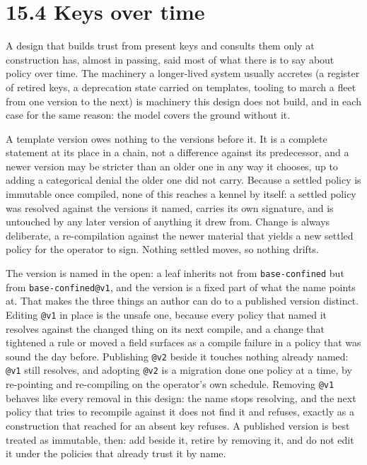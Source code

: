 \hypertarget{keys-over-time}{%
\section{15.4 Keys over time}\label{keys-over-time}}

A design that builds trust from present keys and consults them only at
construction has, almost in passing, said most of what there is to say
about policy over time. The machinery a longer-lived system usually
accretes (a register of retired keys, a deprecation state carried on
templates, tooling to march a fleet from one version to the next) is
machinery this design does not build, and in each case for the same
reason: the model covers the ground without it.

A template version owes nothing to the versions before it. It is a
complete statement at its place in a chain, not a difference against its
predecessor, and a newer version may be stricter than an older one in
any way it chooses, up to adding a categorical denial the older one did
not carry. Because a settled policy is immutable once compiled, none of
this reaches a kennel by itself: a settled policy was resolved against
the versions it named, carries its own signature, and is untouched by
any later version of anything it drew from. Change is always deliberate,
a re-compilation against the newer material that yields a new settled
policy for the operator to sign. Nothing settled moves, so nothing
drifts.

The version is named in the open: a leaf inherits not from
\texttt{base-confined} but from \texttt{base-confined@v1}, and the
version is a fixed part of what the name points at. That makes the three
things an author can do to a published version distinct. Editing
\texttt{@v1} in place is the unsafe one, because every policy that named
it resolves against the changed thing on its next compile, and a change
that tightened a rule or moved a field surfaces as a compile failure in
a policy that was sound the day before. Publishing \texttt{@v2} beside
it touches nothing already named: \texttt{@v1} still resolves, and
adopting \texttt{@v2} is a migration done one policy at a time, by
re-pointing and re-compiling on the operator's own schedule. Removing
\texttt{@v1} behaves like every removal in this design: the name stops
resolving, and the next policy that tries to recompile against it does
not find it and refuses, exactly as a construction that reached for an
absent key refuses. A published version is best treated as immutable,
then: add beside it, retire by removing it, and do not edit it under the
policies that already trust it by name.

